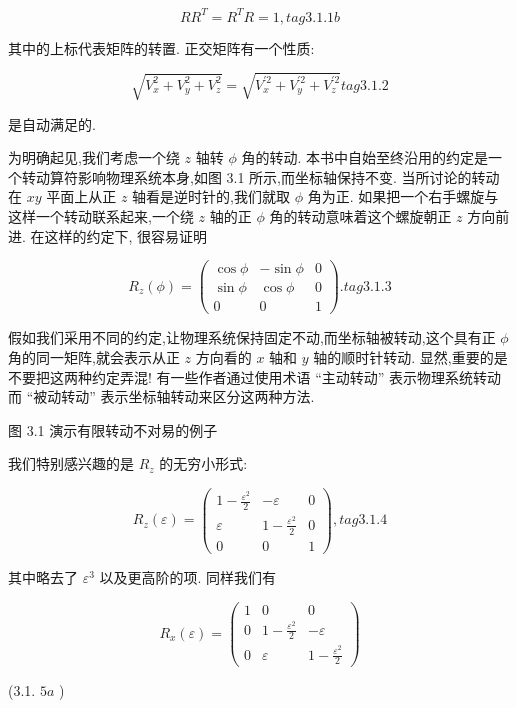 $$
R{R}^{T} = {R}^{T}R = 1, tag{3.1.1b}
$$

其中的上标代表矩阵的转置. 正交矩阵有一个性质:

$$
\sqrt{{V}_{x}^{2} + {V}_{y}^{2} + {V}_{z}^{2}} = \sqrt{{V}_{x}^{\prime 2} + {V}_{y}^{\prime 2} + {V}_{z}^{\prime 2}} tag{3.1.2}
$$

是自动满足的.

为明确起见,我们考虑一个绕 $z$ 轴转 $\phi$ 角的转动. 本书中自始至终沿用的约定是一个转动算符影响物理系统本身,如图 3.1 所示,而坐标轴保持不变. 当所讨论的转动在 ${xy}$ 平面上从正 $z$ 轴看是逆时针的,我们就取 $\phi$ 角为正. 如果把一个右手螺旋与这样一个转动联系起来,一个绕 $z$ 轴的正 $\phi$ 角的转动意味着这个螺旋朝正 $z$ 方向前进. 在这样的约定下, 很容易证明

$$
{R}_{z}\left( \phi \right) = \left( \begin{matrix} \cos \phi & - \sin \phi & 0 \\ \sin \phi & \cos \phi & 0 \\ 0 & 0 & 1 \end{matrix}\right) . tag{3.1.3}
$$

假如我们采用不同的约定,让物理系统保持固定不动,而坐标轴被转动,这个具有正 $\phi$ 角的同一矩阵,就会表示从正 $z$ 方向看的 $x$ 轴和 $y$ 轴的顺时针转动. 显然,重要的是不要把这两种约定弄混! 有一些作者通过使用术语 “主动转动” 表示物理系统转动而 “被动转动” 表示坐标轴转动来区分这两种方法.



图 3.1 演示有限转动不对易的例子

我们特别感兴趣的是 ${R}_{z}$ 的无穷小形式:

$$
{R}_{z}\left( \varepsilon \right) = \left( \begin{matrix} 1 - \frac{{\varepsilon }^{2}}{2} & - \varepsilon & 0 \\ \varepsilon & 1 - \frac{{\varepsilon }^{2}}{2} & 0 \\ 0 & 0 & 1 \end{matrix}\right) , tag{3.1.4}
$$

其中略去了 ${\varepsilon }^{3}$ 以及更高阶的项. 同样我们有

$$
{R}_{x}\left( \varepsilon \right) = \left( \begin{matrix} 1 & 0 & 0 \\ 0 & 1 - \frac{{\varepsilon }^{2}}{2} & - \varepsilon \\ 0 & \varepsilon & 1 - \frac{{\varepsilon }^{2}}{2} \end{matrix}\right)
$$

(3.1. ${5a}$ )

